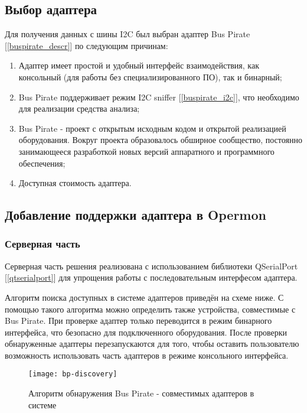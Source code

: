 \subsection{Выбор адаптера}

Для получения данных с шины I2C был выбран адаптер Bus Pirate [\ref{buspirate_descr}] по следующим причинам:

\begin{enumerate}
 \item Адаптер имеет простой и удобный интерфейс взаимодействия, как консольный (для работы без специализированного ПО), так и бинарный;
 \item Bus Pirate поддерживает режим I2C sniffer [\ref{buspirate_i2c}], что необходимо для реализации средства анализа;
 \item Bus Pirate - проект с открытым исходным кодом и открытой реализацией оборудования. Вокруг проекта образовалось обширное сообщество, постоянно занимающееся разработкой новых версий аппаратного и программного обеспечения;
 \item Доступная стоимость адаптера.
\end{enumerate}

\subsection{Добавление поддержки адаптера в Opermon}

\subsubsection{Серверная часть}

Серверная часть решения реализована с использованием библиотеки QSerialPort [\ref{qtserialport}] для упрощения работы с последовательным интерфесом адаптера.

Алгоритм поиска доступных в системе адаптеров приведён на схеме ниже. С помощью такого алгоритма можно определить также устройства, совместимые с Bus Pirate. При проверке адаптер только переводится в режим бинарного интерфейса, что безопасно для подключенного оборудования. После проверки обнаруженные адаптеры перезапускаются для того, чтобы оставить пользователю возможность использовать часть адаптеров в режиме консольного интерфейса.

\begin{figure}[H]
 \centering
 \texttt{[image: bp-discovery]}
 \caption{Алгоритм обнаружения Bus Pirate - совместимых адаптеров в системе}
 \label{fig:bp-discovery}
\end{figure}

